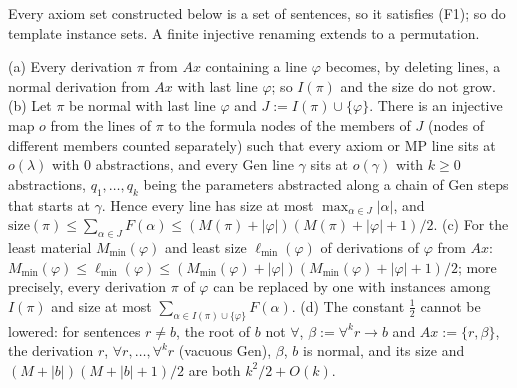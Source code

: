\noindent Every axiom set constructed below is a set of sentences, so it satisfies (F1); so do template instance sets. A finite injective renaming extends to a permutation.

\begin{lemma}\label{lem:time:subformula}
(a) Every derivation $\pi$ from $Ax$ containing a line $\varphi$ becomes, by deleting lines, a normal derivation from $Ax$ with last line $\varphi$; so $I(\pi)$ and the size do not grow.
(b) Let $\pi$ be normal with last line $\varphi$ and $J:=I(\pi)\cup\{\varphi\}$. There is an injective map $o$ from the lines of $\pi$ to the formula nodes of the members of $J$ (nodes of different members counted separately) such that every axiom or MP line sits at $o(\lambda)$ with $0$ abstractions, and every Gen line $\gamma$ sits at $o(\gamma)$ with $k\ge0$ abstractions, $q_1,\dots,q_k$ being the parameters abstracted along a chain of Gen steps that starts at $\gamma$. Hence every line has size at most $\max_{\alpha\in J}|\alpha|$, and $\mathrm{size}(\pi)\le\sum_{\alpha\in J}F(\alpha)\le(M(\pi)+|\varphi|)(M(\pi)+|\varphi|+1)/2$.
(c) For the least material $M_{\min}(\varphi)$ and least size $\ell_{\min}(\varphi)$ of derivations of $\varphi$ from $Ax$: $M_{\min}(\varphi)\le\ell_{\min}(\varphi)\le(M_{\min}(\varphi)+|\varphi|)(M_{\min}(\varphi)+|\varphi|+1)/2$; more precisely, every derivation $\pi$ of $\varphi$ can be replaced by one with instances among $I(\pi)$ and size at most $\sum_{\alpha\in I(\pi)\cup\{\varphi\}}F(\alpha)$.
(d) The constant $\tfrac12$ cannot be lowered: for sentences $r\ne b$, the root of $b$ not $\forall$, $\beta:=\forall^kr\to b$ and $Ax:=\{r,\beta\}$, the derivation $r$, $\forall r,\dots,\forall^kr$ (vacuous Gen), $\beta$, $b$ is normal, and its size and $(M+|b|)(M+|b|+1)/2$ are both $k^2/2+O(k)$.
\end{lemma}

